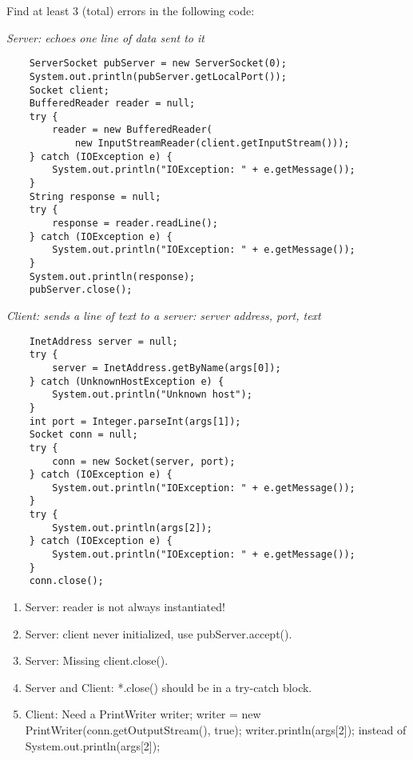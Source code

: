 Find at least 3 (total) errors in the following code:

	\textit{Server: echoes one line of data sent to it}
\begin{lstlisting}
	ServerSocket pubServer = new ServerSocket(0);
	System.out.println(pubServer.getLocalPort());
	Socket client;
	BufferedReader reader = null;
	try {
		reader = new BufferedReader(
			new InputStreamReader(client.getInputStream()));
	} catch (IOException e) {
		System.out.println("IOException: " + e.getMessage());
	}
	String response = null;
	try {
		response = reader.readLine();
	} catch (IOException e) {
		System.out.println("IOException: " + e.getMessage());
	}
	System.out.println(response);
	pubServer.close();
\end{lstlisting}

	\textit{Client: sends a line of text to a server: server address, port, text}
\begin{lstlisting}
	InetAddress server = null;
	try {
		server = InetAddress.getByName(args[0]);
	} catch (UnknownHostException e) {
		System.out.println("Unknown host");
	}
	int port = Integer.parseInt(args[1]);
	Socket conn = null;
	try {
		conn = new Socket(server, port);
	} catch (IOException e) {
		System.out.println("IOException: " + e.getMessage());
	}
	try {
		System.out.println(args[2]);
	} catch (IOException e) {
		System.out.println("IOException: " + e.getMessage());
	}
	conn.close();
\end{lstlisting}
\begin{answer}
	\begin{enumerate}
	\item
		Server: reader is not always instantiated!
	\item
		Server: client never initialized, use pubServer.accept().
	\item
		Server: Missing client.close().
	\item
		Server and Client: *.close() should be in a try-catch block.
	\item
		Client: Need a PrintWriter writer; writer = new PrintWriter(conn.getOutputStream(), true); writer.println(args[2]); instead of System.out.println(args[2]);
	\end{enumerate}
\end{answer}

